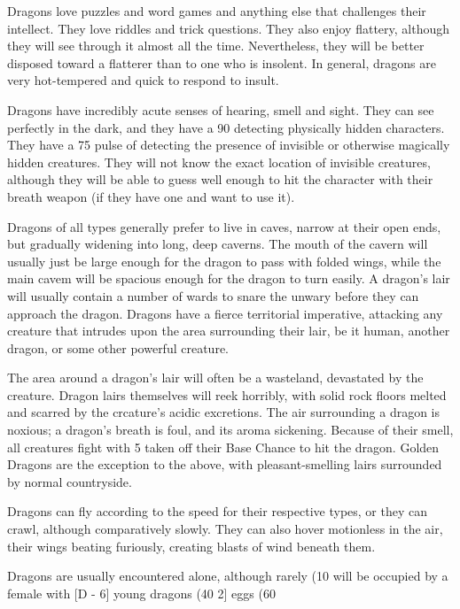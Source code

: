 \begin{multicols}{2}
Dragons love puzzles and word games and anything else that challenges
their intellect.  They love riddles and trick questions.  They also
enjoy flattery, although they will see through it almost all the
time. Nevertheless, they will be better disposed toward a flatterer
than to one who is insolent.  In general, dragons are very
hot-tempered and quick to respond to insult.

Dragons have incredibly acute senses of hearing, smell and sight. They
can see perfectly in the dark, and they have a 90%
detecting physically hidden characters.  They have a 75%
pulse of detecting the presence of invisible or otherwise magically
hidden creatures.  They will not know the exact location of invisible
creatures, although they will be able to guess well enough to hit the
character with their breath weapon (if they have one and want to use
it).

Dragons of all types generally prefer to live in caves, narrow at
their open ends, but gradually widening into long, deep caverns.  The
mouth of the cavern will usually just be large enough for the dragon
to pass with folded wings, while the main cavem will be spacious
enough for the dragon to turn easily.  A dragon's lair will usually
contain a number of wards to snare the unwary before they can approach
the dragon.  Dragons have a fierce territorial imperative, attacking
any creature that intrudes upon the area surrounding their lair, be it
human, another dragon, or some other powerful creature.

The area around a dragon's lair will often be a wasteland, devastated
by the creature.  Dragon lairs themselves will reek horribly, with
solid rock floors melted and scarred by the crcature's acidic
excretions.  The air surrounding a dragon is noxious; a dragon's
breath is foul, and its aroma sickening.  Because of their smell, all
creatures fight with 5 taken off their Base Chance to hit the dragon.
Golden Dragons are the exception to the above, with pleasant-smelling
lairs surrounded by normal countryside.

Dragons can fly according to the speed for their respective types, or
they can crawl, although comparatively slowly.  They can also hover
motionless in the air, their wings beating furiously, creating blasts
of wind beneath them.

Dragons are usually encountered alone, although rarely (10%
will be occupied by a female with [D - 6] young dragons (40%
2] eggs (60%


\end{multicols}
